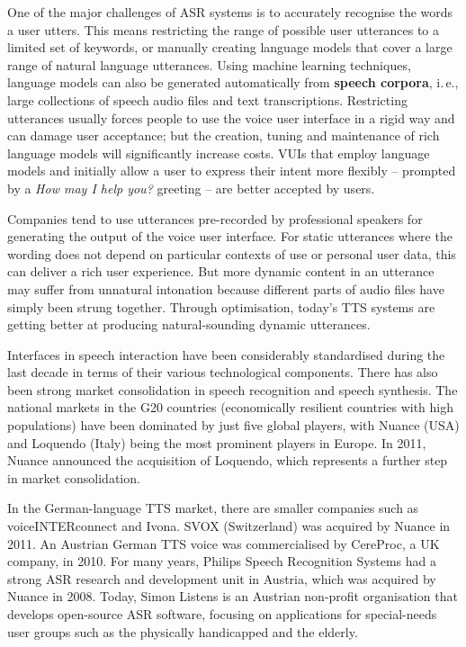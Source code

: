 \begin{multicols}{2}
One of the major challenges of ASR systems is to accurately recognise the words a user utters. This means restricting the range of possible user utterances to a limited set of keywords, or manually creating language models that cover a large range of natural language utterances. Using machine learning techniques, language models can also be generated automatically from \textbf{speech corpora}, i.\,e., large collections of speech audio files and text transcriptions. Restricting utterances usually forces people to use the voice user interface in a rigid way and can damage user acceptance; but the creation, tuning and maintenance of rich language models will significantly increase costs. VUIs that employ language models and initially allow a user to express their intent more flexibly -- prompted by a \textit{How may I help you?} greeting -- are better accepted by users.


Companies tend to use utterances pre-recorded by professional speakers for generating the output of the voice user interface. For static utterances where the wording does not depend on particular contexts of use or personal user data, this can deliver a rich user experience. But more dynamic content in an utterance may suffer from unnatural intonation because different parts of audio files have simply been strung together. Through optimisation, today’s TTS systems are getting better at producing natural-sounding dynamic utterances.

Interfaces in speech interaction have been considerably standardised during the last decade in terms of their various technological components. There has also been strong market consolidation in speech recognition and speech synthesis. The national markets in the G20 countries (economically resilient countries with high populations) have been dominated by just five global players, with Nuance (USA) and Loquendo (Italy) being the most prominent players in Europe. In 2011, Nuance announced the acquisition of Loquendo, which represents a further step in market consolidation.

In the German-language TTS market, there are smaller companies such as voiceINTERconnect and Ivona. SVOX (Switzerland) was acquired by Nuance in 2011. An Austrian German TTS voice was commercialised by CereProc, a UK company, in 2010. For many years, Philips Speech Recognition Systems had a strong ASR research and development unit in Austria, which was acquired by Nuance in 2008. Today, Simon Listens is an Austrian non-profit organisation that develops open-source ASR software, focusing on applications for special-needs user groups such as the physically handicapped and the elderly.


\end{multicols}
